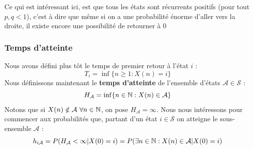 \documentclass[11pt,a4paper]{article}
\numberwithin{equation}{section}
\begin{document}
Ce qui est intéressant ici, est que tous les états sont récurrents positifs (pour tout $p,q < 1$), c'est à dire que même si on a une probabilité énorme d'aller vers la droite, il existe encore une possibilité de retourner à 0

\subsubsection{Temps d'atteinte}
Nous avons défini plus tôt le temps de premier retour à l'état $i$ :
\[T_i = \inf\{n \geq 1 : X(n) = i\}\]
Nous définissons maintenant le \textbf{temps d'atteinte} de l'ensemble d'états $\mathcal{A} \in \mathcal{S}$ :
\begin{equation}
    H_\mathcal{A} = \inf \{ n \in \mathbb{N} : X(n) \in \mathcal{A}\}
\end{equation}
Notons que si $X(n) \notin \mathcal{A}\ \forall n \in \mathbb{N}$, on pose $H_\mathcal{A} = \infty$. Nous nous intéressons pour commencer aux probabilités que, partant d'un état $i \in \mathcal{S}$ on atteigne le sous-ensemble $\mathcal{A}$ :
\begin{equation}
    h_{i\mathcal{A}} = P(H_\mathcal{A} < \infty | X(0) = i) = P(\exists n \in \mathbb{N} : X(n) \in \mathcal{A} | X(0) = i)
\end{equation}
\end{document}
